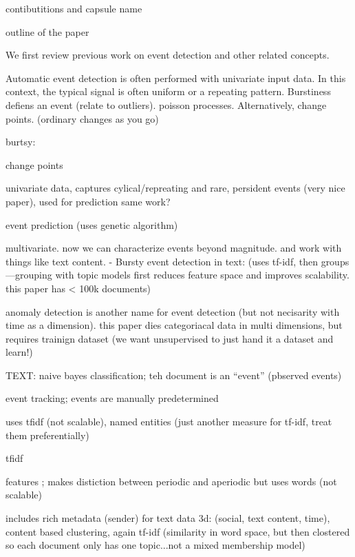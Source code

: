 \PP contibutitions and capsule name

\PP outline of the paper


  We first review previous work on event detection and other related concepts.  

\PP Automatic event detection is often performed with univariate input data.  In this context, the typical signal is often uniform or a repeating pattern.  Burstiness defiens an event (relate to outliers). poisson processes.  Alternatively, change points. (ordinary changes as you go) 

burtsy: \cite{kleinberg2003bursty}

change points \cite{guralnik1999event} 

\cite{Ihler:2006} univariate data, captures cylical/repreating and rare, persident events (very nice paper), used for prediction
\cite{ihler2007learning} same work?


\cite{weiss1998learning} event prediction (uses genetic algorithm)



\PP multivariate.  now we can characterize events beyond magnitude.  and work with things like text content.
- Bursty event detection in text: \cite{fung2005parameter} (uses tf-idf, then groups---grouping with topic models first reduces feature space and improves scalability.  this paper has < 100k documents)

\cite{das2008anomaly} anomaly detection is another name for event detection (but not necisarity with time as a dimension).  this paper dies categoriacal data in multi dimensions, but requires trainign dataset (we want unsupervised to just hand it a dataset and learn!)


TEXT:
\cite{mccallum1998comparison} naive bayes classification; teh document is an ``event'' (pbserved events)

\cite{yang2000improving}event tracking; events are manually predetermined

\cite{kumaran2004text} uses tfidf (not scalable), named entities (just another measure for tf-idf, treat them preferentially)


\cite{brants2003system} tfidf

\cite{das2011dynamic} features ; makes distiction between periodic and aperiodic but uses words (not scalable)

\cite{zhao2007temporal} includes rich metadata (sender) for text data 3d: (social, text content, time), content based clustering, again tf-idf (similarity in word space, but then clostered so each document only has one topic...not a mixed membership model)



